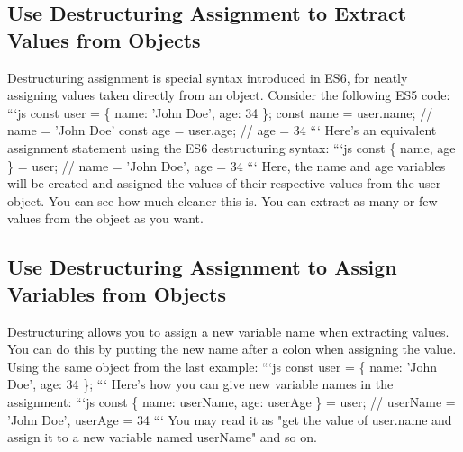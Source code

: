\documentclass{article}%
\begin{document}
\subsection{Use Destructuring Assignment to Extract Values from Objects}%
\label{subsec:UseDestructuringAssignmenttoExtractValuesfromObjects}%
Destructuring assignment is special syntax introduced in ES6, for neatly assigning values taken directly from an object.\newline%
Consider the following ES5 code:\newline%
```js\newline%
const user = \{ name: 'John Doe', age: 34 \};\newline%
const name = user.name; // name = 'John Doe'\newline%
const age = user.age; // age = 34\newline%
```\newline%
Here's an equivalent assignment statement using the ES6 destructuring syntax:\newline%
```js\newline%
const \{ name, age \} = user;\newline%
// name = 'John Doe', age = 34\newline%
```\newline%
Here, the name and age variables will be created and assigned the values of their respective values from the user object. You can see how much cleaner this is.\newline%
You can extract as many or few values from the object as you want.\newline%

%
\subsection{Use Destructuring Assignment to Assign Variables from Objects}%
\label{subsec:UseDestructuringAssignmenttoAssignVariablesfromObjects}%
Destructuring allows you to assign a new variable name when extracting values. You can do this by putting the new name after a colon when assigning the value.\newline%
Using the same object from the last example:\newline%
```js\newline%
const user = \{ name: 'John Doe', age: 34 \};\newline%
```\newline%
Here's how you can give new variable names in the assignment:\newline%
```js\newline%
const \{ name: userName, age: userAge \} = user;\newline%
// userName = 'John Doe', userAge = 34\newline%
```\newline%
You may read it as "get the value of user.name and assign it to a new variable named userName" and so on.\newline%
\end{document}
